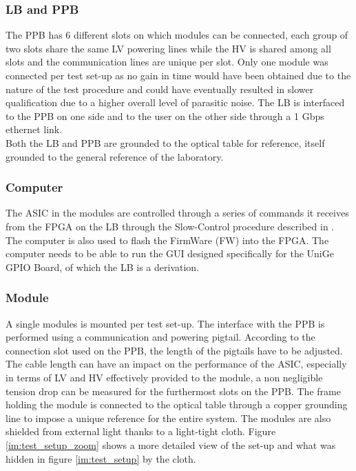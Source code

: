			\subsubsection{LB and PPB} 
			The PPB has 6 different slots on which modules can be connected, each group of two slots share the same LV powering lines while the HV is shared among all slots and the communication lines are unique per slot. Only one module was connected per test set-up as no gain in time would have been obtained due to the nature of the test procedure and could have eventually resulted in slower qualification due to a higher overall level of parasitic noise.
			The LB is interfaced to the PPB on one side and to the user on the other side through a 1 Gbps ethernet link. \\
			Both the LB and PPB are grounded to the optical table for reference, itself grounded to the general reference of the laboratory. 
			
			\subsubsection{Computer} 
			The ASIC in the modules are controlled through a series of commands it receives from the FPGA on the LB through the Slow-Control procedure described in . The computer is also used to flash the FirmWare (FW) into the FPGA. The computer needs to be able to run the GUI designed specifically for the UniGe GPIO Board, of which the LB is a derivation. 
			
			\subsubsection{Module}
			A single modules is mounted per test set-up. The interface with the PPB is performed using a communication and powering pigtail. According to the connection slot used on the PPB, the length of the pigtails have to be adjusted. The cable length can have an impact on the performance of the ASIC, especially in terms of LV and HV effectively provided to the module, a non negligible tension drop can be measured for the furthermost slots on the PPB. The frame holding the module is connected to the optical table through a copper grounding line to impose a unique reference for the entire system. The modules are also shielded from external light thanks to a light-tight cloth. 
			Figure \ref{im:test_setup_zoom} shows a more detailed view of the set-up and what was hidden in figure \ref{im:test_setup} by the cloth.
			
